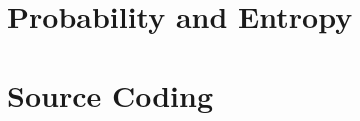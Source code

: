\documentclass[11pt,fleqn]{book} %
\begin{document}
\newcommand{\es}{\bot}
\newcommand{\strg}{\{0,1\}^*}
\newcommand{\len}{\ell}

\newcommand{\col}{\mathrm{Col}}
\newcommand{\guess}{{\sl guess}}

\newcommand{\bfX}{\text{\boldmath $X$}}
\newcommand{\bfx}{\text{\boldmath $x$}}

\newcommand{\AC}{A\hspace{-0.2ex}C}

\newcommand{\supp}{\mathrm{supp}}
\newcommand{\Exp}{\mathbb{E}}
\newcommand{\Var}{\mathrm{Var}}


\newcommand{\entropydiagramXY}[7][1.5]{
\begin{tikzpicture}
\def\size{#1}
\draw (0,0) circle (\size cm);
\draw (\size,0) circle (\size cm);
\node at (-\size/2,0) {#5};
\node at (\size+\size/2,0) {#6};
\node at (\size/2,0) {#7};
\node at (\size/2,-\size - 0.25*\size) {#4};
\node at (-\size/2,\size + 0.1) {#2};
\node at (\size*1.5,\size + 0.1) {#3};
\end{tikzpicture}
}

\newcommand{\entropydiagramXYZ}[7][1.5]{
\begin{tikzpicture}
\def\size{#1}
\draw (0,0) circle (\size cm);
\draw (\size,0) circle (\size cm);
\draw (\size/2,-\size) circle (\size cm);
\node at (-\size/2,0) {#5};
\node at (\size+\size/2,0) {#6};
\node at (\size/2,0) {#7};
\node at (\size/2,-\size - 0.25*\size) {#4};
\node at (-\size/2,\size + 0.1) {#2};
\node at (\size*1.5,\size + 0.1) {#3};
\end{tikzpicture}
}


%




\chapter{Probability and Entropy}
\setcounter{page}{1}



\chapter{Source Coding}\label{ch:source-coding}

\end{document}
